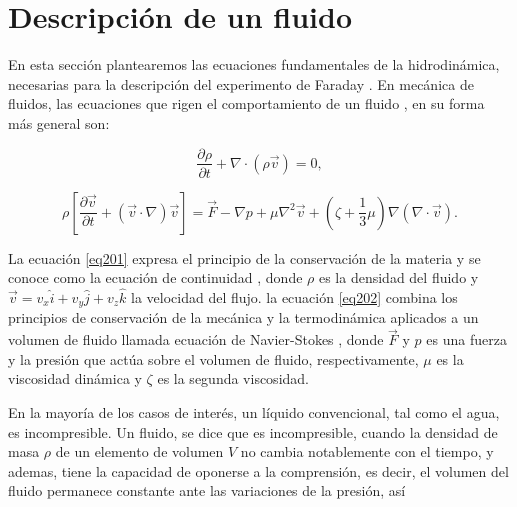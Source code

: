 \section{Descripción de un fluido}

En esta sección plantearemos las ecuaciones fundamentales de la hidrodinámica, necesarias para la descripción del experimento de Faraday \cite{Faraday1831}. En mecánica de fluidos, las ecuaciones que rigen el comportamiento de un fluido \cite{Landau1987, Batchelor2002, Lamb1975}, en su forma más general son:

\begin{equation} \label{eq201}
   \frac{\partial \rho}{\partial t} + \nabla \cdot (\rho \vec{v}) = 0,
\end{equation}


\begin{equation}\label{eq202}
   \rho \left[\frac{\partial \vec{v}}{\partial t} + (\vec{v} \cdot \nabla ) \vec{v}\right] = \vec{F} - \nabla p + \mu  \nabla^2 \vec{v} + (\zeta + \frac{1}{3} \mu) \nabla (\nabla \cdot \vec{v}).
\end{equation} \medskip


\noindent La ecuación \ref{eq201} expresa el principio de la conservación de la materia y se conoce como la ecuación de continuidad , donde $\rho$ es la densidad del fluido y $\vec{v} = v_x\hat{i} + v_y\hat{j} + v_z\hat{k}$ la velocidad del flujo. la ecuación \ref{eq202} combina los principios de conservación de la mecánica y la termodinámica aplicados a un volumen de fluido llamada ecuación de Navier-Stokes , donde $\vec{F}$ y $p$ es una fuerza y la presión que actúa sobre el volumen de fluido, respectivamente, $\mu$ es la viscosidad dinámica y $\zeta$ es la segunda viscosidad.

En la mayoría de los casos de interés, un líquido convencional, tal como el agua, es incompresible. Un fluido, se dice que es incompresible, cuando la densidad de masa $\rho$ de un elemento de volumen $V$ no cambia notablemente con el tiempo, y ademas, tiene la capacidad de oponerse a la comprensión, es decir, el volumen del fluido permanece constante ante las variaciones de la presión, así

